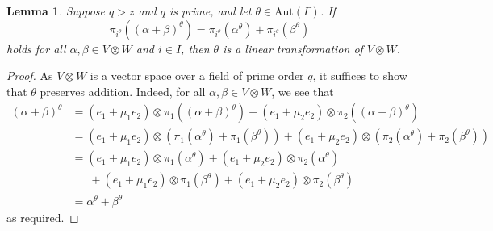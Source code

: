 \documentclass[10pt]{amsart}
\theoremstyle{definition}
\theoremstyle{plain}
\newtheorem{lemma}[lemma]{Lemma}
\theoremstyle{plain}
\theoremstyle{plain}
\theoremstyle{plain}
\newcommand{\Aut}{\mathrm{Aut}}
\begin{document}
\begin{lemma} \label{lm:automorphism-linear-sufficiency}
Suppose $q > z$ and $q$ is prime, and let $\theta \in \Aut{\left(\Gamma \right)}$. If
\begin{displaymath}
    \pi_{i^\theta}{\left(\left(\alpha + \beta \right)^\theta \right)} = \pi_{i^\theta}{\left(\alpha^\theta \right)} + \pi_{i^\theta}{\left(\beta^\theta \right)}
\end{displaymath}
holds for all $\alpha, \beta \in V \otimes W$ and $i \in I$, then $\theta$ is a linear transformation of $V \otimes W$.
\end{lemma}
\begin{proof}
As $V \otimes W$ is a vector space over a field of prime order $q$, it suffices to show that $\theta$ preserves addition. Indeed, for all $\alpha, \beta \in V \otimes W$, we see that
\begin{align*}
    \left(\alpha + \beta \right)^\theta &= \left(e_1 + \mu_1 e_2 \right) \otimes \pi_1{\left(\left(\alpha + \beta \right)^\theta \right)} + \left(e_1 + \mu_2 e_2 \right) \otimes \pi_2{\left(\left(\alpha + \beta \right)^\theta \right)} \\
    &= \left(e_1 + \mu_1 e_2 \right) \otimes \left(\pi_1{\left(\alpha^\theta \right)} + \pi_1{\left(\beta^\theta \right)}\right) + \left(e_1 + \mu_2 e_2 \right) \otimes \left(\pi_2{\left(\alpha^\theta \right)} + \pi_2{\left(\beta^\theta \right)}\right) \\
    &= \left(e_1 + \mu_1 e_2 \right) \otimes \pi_1{\left(\alpha^\theta \right)} + \left(e_1 + \mu_2 e_2 \right) \otimes \pi_2{\left(\alpha^\theta \right)} \\
    &\ \ \ \ \ \ \ + \left(e_1 + \mu_1 e_2 \right) \otimes \pi_1{\left(\beta^\theta \right)} + \left(e_1 + \mu_2 e_2 \right) \otimes \pi_2{\left(\beta^\theta \right)} \\
    &= \alpha^\theta + \beta^\theta
\end{align*}
as required.
\end{proof}
\end{document}
